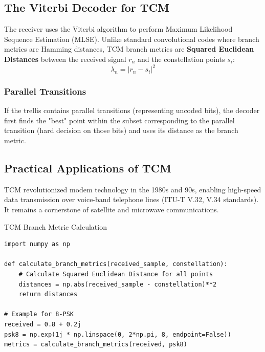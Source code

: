 \subsection{The Viterbi Decoder for TCM}
The receiver uses the Viterbi algorithm to perform Maximum Likelihood Sequence Estimation (MLSE). Unlike standard convolutional codes where branch metrics are Hamming distances, TCM branch metrics are \textbf{Squared Euclidean Distances} between the received signal $r_n$ and the constellation points $s_i$:
\begin{equation}
    \lambda_n = |r_n - s_i|^2
\end{equation}

\subsubsection{Parallel Transitions}
If the trellis contains parallel transitions (representing uncoded bits), the decoder first finds the "best" point within the subset corresponding to the parallel transition (hard decision on those bits) and uses its distance as the branch metric.

\begin{center}
\end{center}

\subsection{Practical Applications of TCM}
TCM revolutionized modem technology in the 1980s and 90s, enabling high-speed data transmission over voice-band telephone lines (ITU-T V.32, V.34 standards). It remains a cornerstone of satellite and microwave communications.

\begin{pythonbox}{TCM Branch Metric Calculation}
\begin{verbatim}
import numpy as np

def calculate_branch_metrics(received_sample, constellation):
    # Calculate Squared Euclidean Distance for all points
    distances = np.abs(received_sample - constellation)**2
    return distances

# Example for 8-PSK
received = 0.8 + 0.2j
psk8 = np.exp(1j * np.linspace(0, 2*np.pi, 8, endpoint=False))
metrics = calculate_branch_metrics(received, psk8)
\end{verbatim}
\end{pythonbox}

